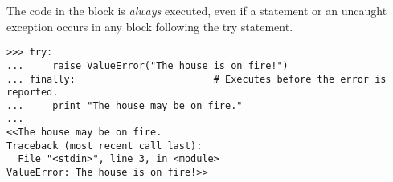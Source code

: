 The code in the  block is \emph{always} executed, even if a  statement or an uncaught exception occurs in any block following the try statement.

\begin{lstlisting}
>>> try:
...     raise ValueError("The house is on fire!")
... finally:                        # Executes before the error is reported.
...     print "The house may be on fire."
... 
<<The house may be on fire.
Traceback (most recent call last):
  File "<stdin>", line 3, in <module>
ValueError: The house is on fire!>>
\end{lstlisting}

\begin{comment} %
\begin{warn} %
Having \li{except} by itself will catch \emph{any} exception raised in the \li{try} block, but this approach can mistakenly mask unexpected errors.
Consider the following function, which intends to avoid dividing by zero.

\begin{lstlisting}
>>> def divider(x, y):
...     try:
...         return x / float(yy)
...     except:
...         print("y must not equal zero!")
... 
>>> divider(2, 3)
<<y must not equal zero!>>
\end{lstlisting}

Because \li{y} was misspelled, a \li{NameError} will be raised every time this function is called.
Be specific about the kind of exception you expect to encounter.

\begin{lstlisting}
>>> def divider(x, y):
...     try:
...         return x / float(yy)
...     except ZeroDivisionError:
...         print("y must not equal zero!")
... 
>>> divider(2, 3)
<<Traceback (most recent call last):
  File "<stdin>", line 1, in <module>
  File "<stdin>", line 3, in divider
NameError: global name 'yy' is not defined>>
\end{lstlisting}
\end{warn}
\end{comment}

